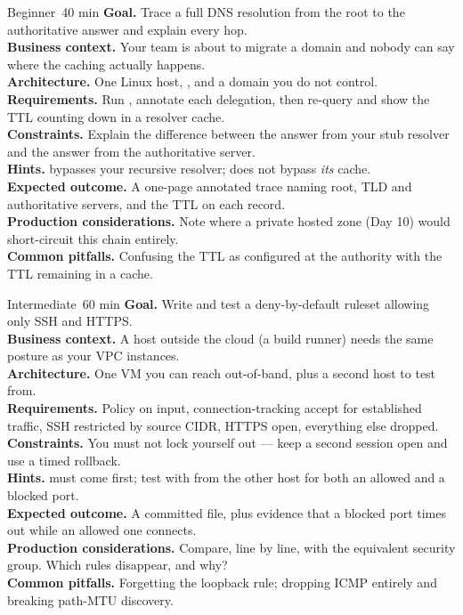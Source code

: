 
\begin{minilab}{Beginner}{~40 min}
\textbf{Goal.} Trace a full DNS resolution from the root to the authoritative answer and explain every hop.\\
\textbf{Business context.} Your team is about to migrate a domain and nobody can say where the caching actually happens.\\
\textbf{Architecture.} One Linux host, , and a domain you do not control.\\
\textbf{Requirements.} Run , annotate each delegation, then re-query and show the TTL counting down in a resolver cache.\\
\textbf{Constraints.} Explain the difference between the answer from your stub resolver and the answer from the authoritative server.\\
\textbf{Hints.}  bypasses your recursive resolver;  does not bypass \emph{its} cache.\\
\textbf{Expected outcome.} A one-page annotated trace naming root, TLD and authoritative servers, and the TTL on each record.\\
\textbf{Production considerations.} Note where a private hosted zone (Day 10) would short-circuit this chain entirely.\\
\textbf{Common pitfalls.} Confusing the TTL as configured at the authority with the TTL remaining in a cache.
\end{minilab}

\begin{minilab}{Intermediate}{~60 min}
\textbf{Goal.} Write and test a deny-by-default  ruleset allowing only SSH and HTTPS.\\
\textbf{Business context.} A host outside the cloud (a build runner) needs the same posture as your VPC instances.\\
\textbf{Architecture.} One VM you can reach out-of-band, plus a second host to test from.\\
\textbf{Requirements.} Policy  on input, connection-tracking accept for established traffic, SSH restricted by source CIDR, HTTPS open, everything else dropped.\\
\textbf{Constraints.} You must not lock yourself out --- keep a second session open and use a timed rollback.\\
\textbf{Hints.}  must come first; test with  from the other host for both an allowed and a blocked port.\\
\textbf{Expected outcome.} A committed  file, plus evidence that a blocked port times out while an allowed one connects.\\
\textbf{Production considerations.} Compare, line by line, with the equivalent security group. Which rules disappear, and why?\\
\textbf{Common pitfalls.} Forgetting the loopback rule; dropping ICMP entirely and breaking path-MTU discovery.
\end{minilab}

